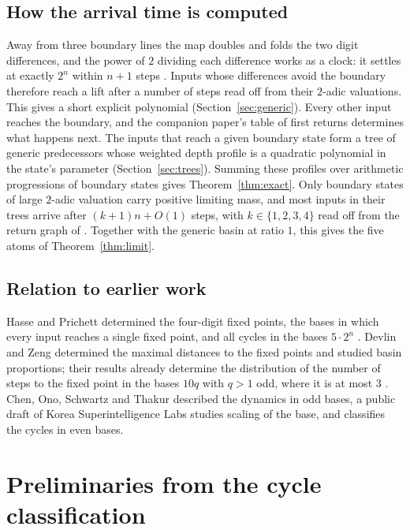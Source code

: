 \documentclass[11pt]{amsart}
\theoremstyle{remark}
\begin{document}
\subsection*{How the arrival time is computed}
Away from three boundary lines the map doubles and folds the two digit differences, and the power of $2$ dividing each difference works as a clock: it settles at exactly $2^n$ within $n+1$ steps \cite[Lemma~4]{G1}. Inputs whose differences avoid the boundary therefore reach a lift after a number of steps read off from their $2$-adic valuations. This gives a short explicit polynomial (Section~\ref{sec:generic}). Every other input reaches the boundary, and the companion paper's table of first returns \cite[Proposition~7]{G1} determines what happens next. The inputs that reach a given boundary state form a tree of generic predecessors whose weighted depth profile is a quadratic polynomial in the state's parameter (Section~\ref{sec:trees}). Summing these profiles over arithmetic progressions of boundary states gives Theorem~\ref{thm:exact}. Only boundary states of large $2$-adic valuation carry positive limiting mass, and most inputs in their trees arrive after $(k+1)n+O(1)$ steps, with $k\in\{1,2,3,4\}$ read off from the return graph of \cite{G1}. Together with the generic basin at ratio $1$, this gives the five atoms of Theorem~\ref{thm:limit}.

\subsection*{Relation to earlier work}
Hasse and Prichett \cite{HP} determined the four-digit fixed points, the bases in which every input reaches a single fixed point, and all cycles in the bases $5\cdot2^n$ \cite[Theorem~4.1]{HP}. Devlin and Zeng \cite{DZ} determined the maximal distances to the fixed points and studied basin proportions; their results already determine the distribution of the number of steps to the fixed point in the bases $10q$ with $q>1$ odd, where it is at most $3$ \cite[Theorems~1 and~2 and Lemmas~1 and~2]{DZ}. Chen, Ono, Schwartz and Thakur \cite{COST} described the dynamics in odd bases, a public draft of Korea Superintelligence Labs \cite{KSL} studies scaling of the base, and \cite{G1} classifies the cycles in even bases.

\section{Preliminaries from the cycle classification}\label{sec:prelim}
\end{document}
